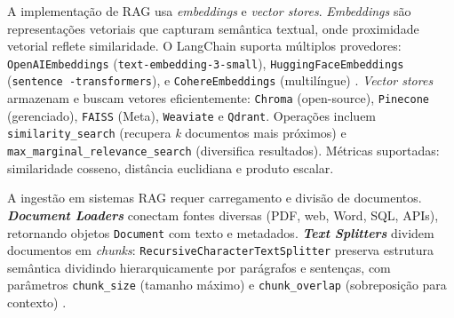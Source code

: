 \documentclass[12pt]{article}
\begin{document}

A implementação de RAG usa \textit{embeddings} e \textit{vector stores}. \textit{Embeddings} são representações vetoriais que capturam semântica textual, onde proximidade vetorial reflete similaridade. O LangChain suporta múltiplos provedores: \texttt{OpenAIEmbeddings} (\texttt{text-embedding-3-small}), \texttt{HuggingFaceEmbeddings} (\texttt{sentence -transformers}), e \texttt{CohereEmbeddings} (multilíngue) \cite{langchain2023docs}. \textit{Vector stores} armazenam e buscam vetores eficientemente: \texttt{Chroma} (open-source), \texttt{Pinecone} (gerenciado), \texttt{FAISS} (Meta), \texttt{Weaviate} e \texttt{Qdrant}. Operações incluem \texttt{similarity\_search} (recupera \textit{k} documentos mais próximos) e \texttt{max\_marginal\_relevance\_search} (diversifica resultados). Métricas suportadas: similaridade cosseno, distância euclidiana e produto escalar.


A ingestão em sistemas RAG requer carregamento e divisão de documentos. \textbf{\textit{Document Loaders}} conectam fontes diversas (PDF, web, Word, SQL, APIs), retornando objetos \texttt{Document} com texto e metadados. \textbf{\textit{Text Splitters}} dividem documentos em \textit{chunks}: \texttt{RecursiveCharacterTextSplitter} preserva estrutura semântica dividindo hierarquicamente por parágrafos e sentenças, com parâmetros \texttt{chunk\_size} (tamanho máximo) e \texttt{chunk\_overlap} (sobreposição para contexto) \cite{langchain2023docs}.

\end{document}
